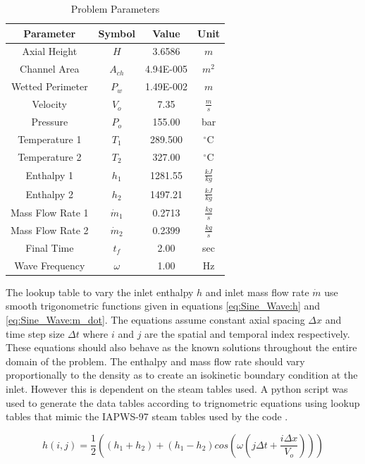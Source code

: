 \documentclass{mc2015}
\begin{document}
\begin{table}[h]
\center
\caption{Problem Parameters}
\label{table:parameters}
\begin{tabular}{|c|c|c|c|}
\hline
Parameter	&	Symbol	&	Value	&	Unit	\\ \hline
Axial Height	&	$H$	&	3.6586	&	$m$	\\ \hline
Channel Area	&	$A_{ch}$	&	4.94E-005	&	$m^{2}$	\\ \hline
Wetted Perimeter	&	$P_{w}$	&	1.49E-002	&	$m$	\\ \hline
Velocity	&	$V_{o}$	&	7.35	&	$\frac{m}{s}$	\\ \hline
Pressure	&	$P_{o}$	&	155.00	&	bar	\\ \hline
Temperature 1	&	$T_{1}$	&	289.500	&	$^{\circ}$C	\\ \hline
Temperature 2	&	$T_{2}$	&	327.00	&	$^{\circ}$C	\\ \hline
Enthalpy 1	&	$h_{1}$	&	1281.55	&	$\frac{kJ}{kg}$	\\ \hline
Enthalpy 2	&	$h_{2}$	&	1497.21	&	$\frac{kJ}{kg}$	\\ \hline
Mass Flow Rate 1	&	$\dot{m}_{1}$	&	0.2713	&	$\frac{kg}{s}$	\\ \hline
Mass Flow Rate 2	&	$\dot{m}_{2}$	&	0.2399	&	$\frac{kg}{s}$	\\ \hline
Final Time	&	$t_{f}$	&	2.00	&	sec	\\ \hline
Wave Frequency	&	$\omega$	&	1.00	&	Hz	\\ \hline
\end{tabular}
\end{table}

The lookup table to vary the inlet enthalpy $h$ and inlet mass
flow rate $\dot{m}$ use smooth trigonometric functions given in equations
\ref{eq:Sine_Wave:h} and \ref{eq:Sine_Wave:m_dot}. The equations assume constant
axial spacing $\Delta x$ and time step size $\Delta t$ where $i$ and $j$ are
the spatial and temporal index respectively. These equations should also
behave as the known solutions throughout the entire domain of the problem. The
enthalpy and mass flow rate should vary proportionally to the density as to
create an isokinetic boundary condition at the inlet. However this is dependent
on the steam tables used. A python script was used to generate the data tables
according to trignometric equations using lookup tables that mimic the IAPWS-97
steam tables used by the code \cite{IAPWS}.

\begin{equation}
	\label{eq:Sine_Wave:h}
	h(i,j) = \frac{1}{2} \left( 
			(h_{1}+h_{2}) + (h_{1}-h_{2}) cos\left(
				\omega \left( j \Delta t + \frac{i \Delta x}{V_{o}} \right)
				\right)
			\right)
\end{equation}
\end{document}
